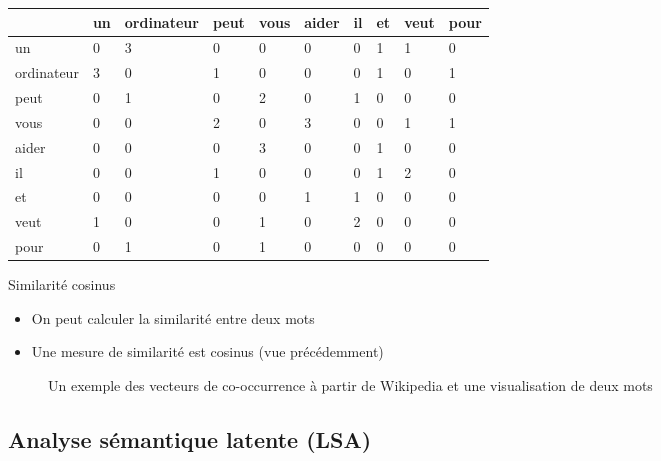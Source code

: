 \documentclass{KodeBook}
\begin{document}
\begin{center}
	\scriptsize
	\begin{tabular}{llllllllll}
		\hline\hline
		& un & ordinateur & peut & vous & aider & il & et & veut & pour \\
		\hline
		un & 0 & 3 & 0 & 0 & 0 & 0 & 1 & 1 & 0\\
		ordinateur & 3 & 0 & 1 & 0 & 0 & 0 & 1 & 0 & 1\\
		peut & 0 & 1 & 0 & 2 & 0 & 1 & 0 & 0 & 0\\
		vous & 0 & 0 & 2 & 0 & 3 & 0 & 0 & 1 & 1\\
		aider & 0 & 0 & 0 & 3 & 0 & 0 & 1 & 0 & 0\\
		il & 0 & 0 & 1 & 0 & 0 & 0 & 1 & 2 & 0\\
		et & 0 & 0 & 0 & 0 & 1 & 1 & 0 & 0 & 0\\
		veut & 1 & 0 & 0 & 1 & 0 & 2 & 0 & 0 & 0\\
		pour & 0 & 1 & 0 & 1 & 0 & 0 & 0 & 0 & 0\\
		\hline\hline
	\end{tabular}
\end{center}

Similarité cosinus

\begin{itemize}
	\item On peut calculer la similarité entre deux mots
	\item Une mesure de similarité est cosinus (vue précédemment)
\end{itemize}


\begin{figure}
	\caption{Un exemple des vecteurs de co-occurrence à partir de Wikipedia et une visualisation de deux mots \cite{2019-jurafsky-martin} }
\end{figure}
\begin{minipage}{.4\textwidth}
\end{minipage}

\subsection{Analyse sémantique latente (LSA)}
\end{document}
